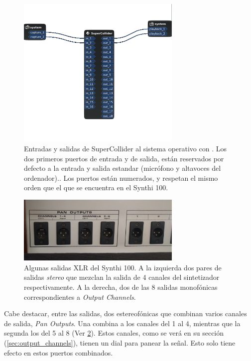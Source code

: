 \begin{figure}
	\centering
	\includegraphics[width=0.7\textwidth]{images/entradas_salidas}
	\caption[Entradas y salidas al sistema]{Entradas y salidas de SuperCollider al sistema operativo con \appName. Los dos primeros puertos de entrada y de salida, están reservados por defecto a la entrada y salida estandar (micrófono y altavoces del ordenador).. Los puertos están numerados, y respetan el mismo orden que el que se encuentra en el Synthi 100.}
	\label{fig:entradas_salidas}
\end{figure}

\begin{figure}
	\centering
	\includegraphics[width=0.7\textwidth]{images/outputs_xlr}
	\caption[Algunas salidas XLR del Synthi 100]{Algunas salidas XLR del Synthi 100. A la izquierda dos pares de salidas \textit{stereo} que mezclan la salida de 4 canales del sintetizador respectivamente. A la derecha, dos de las 8 salidas monofónicas correspondientes a \textit{Output Channels}.}
	\label{fig:outputs_xlr}
\end{figure}

Cabe destacar, entre las salidas, dos estereofónicas que combinan varios canales de salida, \textit{Pan Outputs}. Una combina a los canales del 1 al 4, mientras que la segunda los del 5 al 8 (Ver \ref{fig:outputs_xlr}). Estos canales, como se verá en su sección (\ref*{sec:output_channels}), tienen un dial para panear la señal. Esto solo tiene efecto en estos puertos combinados.